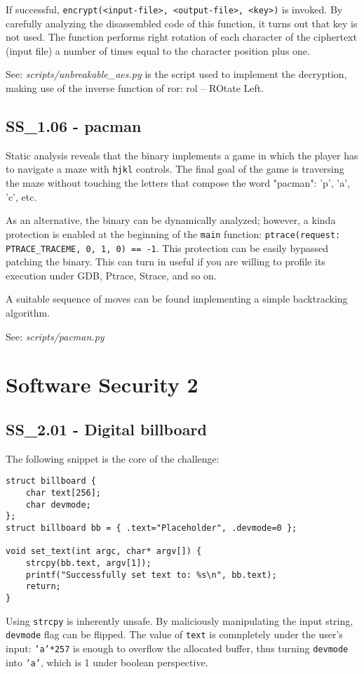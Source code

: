 If successful, \texttt{encrypt(<input-file>, <output-file>, <key>)} is invoked.
By carefully analyzing the disassembled code of this function, it turns out that key is not used.
The function performs right rotation of each character of the ciphertext (input file) a number of times equal to the character position plus one.

See: \textit{scripts/unbreakable_aes.py} is the script used to implement the decryption, making use of the inverse function of ror: rol -- ROtate Left.

\subsection{SS_1.06 - pacman}
Static analysis reveals that the binary implements a game in which the player has to navigate a maze with \texttt{hjkl} controls.
The final goal of the game is traversing the maze without touching the letters that compose the word "pacman": 'p', 'a', 'c', etc.

As an alternative, the binary can be dynamically analyzed; however, a kinda protection is enabled at the beginning of the \texttt{main} function: \texttt{ptrace(request: PTRACE_TRACEME, 0, 1, 0) == -1}.
This protection can be easily bypassed patching the binary. This can turn in useful if you are willing to profile its execution under GDB, Ptrace, Strace, and so on.

A suitable sequence of moves can be found implementing a simple backtracking algorithm.

See: \textit{scripts/pacman.py}

\section{Software Security 2}
\subsection{SS_2.01 - Digital billboard}
The following snippet is the core of the challenge:
\begin{verbatim}
struct billboard {
    char text[256];
    char devmode;
};
struct billboard bb = { .text="Placeholder", .devmode=0 };

void set_text(int argc, char* argv[]) {
    strcpy(bb.text, argv[1]);
    printf("Successfully set text to: %s\n", bb.text);
    return;
}
\end{verbatim}

Using \texttt{strcpy} is inherently unsafe.
By maliciously manipulating the input string, \texttt{devmode} flag can be flipped.
The value of \texttt{text} is comnpletely under the user's input: \texttt{'a'*257} is enough to overflow the allocated buffer, thus turning \texttt{devmode} into \texttt{'a'}, which is 1 under boolean perspective.

